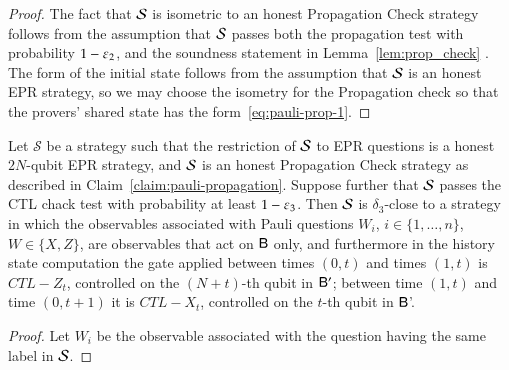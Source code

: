 \begin{proof}
The fact that $\mathcal{S}$ is isometric to an honest Propagation Check strategy follows from the assumption that  $\mathcal{S}$ passes both the propagation test with probability $1-\varepsilon_2$, and the soundness statement in Lemma~\ref{lem:prop_check} . The form of the initial state follows from the assumption that $\mathcal{S}$ is an honest EPR strategy, so we may choose the isometry for the Propagation check so that the provers' shared state has the form~\eqref{eq:pauli-prop-1}. 
\end{proof}


\begin{claim}\label{claim:pauli-ctl}
Let $\mathcal{S}$ be a strategy such that the restriction of $\mathcal{S}$ to EPR questions is a honest $2N$-qubit EPR strategy, and $\mathcal{S}$ is an honest Propagation Check strategy as described in Claim~\ref{claim:pauli-propagation}. Suppose further that $\mathcal{S}$ passes the CTL chack test with probability at least $1-\varepsilon_3$. Then $\mathcal{S}$ is $\delta_3$-close to a strategy in which the observables associated with Pauli questions $W_i$, $i\in\{1,\ldots,n\}$, $W\in\{X,Z\}$, are observables that act on ${\mathsf{B}}$ only, and furthermore in the history state computation the gate applied between times $(0,t)$ and times $(1,t)$ is $CTL-Z_t$, controlled on the $(N+t)$-th qubit in ${\mathsf{B}}'$; between time $(1,t)$ and time $(0,t+1)$ it is $CTL-X_t$, controlled on the $t$-th qubit in ${\mathsf{B}}$'. 
\end{claim}

\begin{proof}
Let $W_i$ be the observable associated with the question having the same label in $\mathcal{S}$. 

\end{proof}


